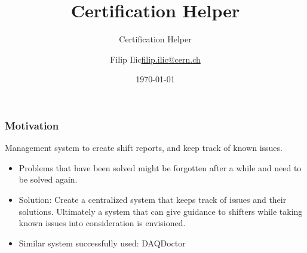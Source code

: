 \documentclass{beamer}
\title{Certification Helper}
\subtitle{Certification Helper}
\author{\texorpdfstring{Filip Ilic\newline\url{filip.ilic@cern.ch}}{Filip ilic}}
\date{\today}
\begin{document}
\maketitle


\begin{frame}
  \frametitle{Motivation} 
  Management system to create shift reports, and keep track of known issues. 
	\begin{itemize}
	\item Problems that have been solved might be forgotten after a while and need to be solved again. 
	\item Solution: Create a centralized system that keeps track of issues and their solutions. 
Ultimately a system that can give guidance to shifters while taking known issues into consideration is envisioned.
	\item Similar system successfully used: DAQDoctor
	\end{itemize}
\end{frame}
\end{document}
